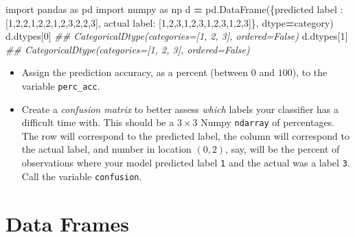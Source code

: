 \documentclass[
  12pt,
  krantz2]{krantz}
\makeatletter
\newenvironment{Shaded}{\begin{snugshade}}{\end{snugshade}}
\newcommand{\CommentTok}[1]{\textcolor[rgb]{0.37,0.37,0.37}{\textit{#1}}}
\newcommand{\DecValTok}[1]{\textcolor[rgb]{0.06,0.06,0.06}{#1}}
\newcommand{\ImportTok}[1]{#1}
\newcommand{\NormalTok}[1]{#1}
\newcommand{\OperatorTok}[1]{\textcolor[rgb]{0.43,0.43,0.43}{\textbf{#1}}}
\newcommand{\StringTok}[1]{\textcolor[rgb]{0.5,0.5,0.5}{#1}}
\providecommand{\tightlist}{%
  \setlength{\itemsep}{0pt}\setlength{\parskip}{0pt}}
\newenvironment{kframe}{%
\medskip{}
\setlength{\fboxsep}{.8em}
 \def\at@end@of@kframe{}%
 \ifinner\ifhmode%
  \def\at@end@of@kframe{\end{minipage}}%
  \begin{minipage}{\columnwidth}%
 \fi\fi%
 \def\FrameCommand##1{\hskip\@totalleftmargin \hskip-\fboxsep
 \colorbox{shadecolor}{##1}\hskip-\fboxsep
     \hskip-\linewidth \hskip-\@totalleftmargin \hskip\columnwidth}%
 \MakeFramed {\advance\hsize-\width
   \@totalleftmargin\z@ \linewidth\hsize
   \@setminipage}}%
 {\par\unskip\endMakeFramed%
 \at@end@of@kframe}
\renewenvironment{Shaded}{\begin{kframe}}{\end{kframe}}
\makeatother
\begin{document}
\begin{Shaded}
\begin{Highlighting}[]
\ImportTok{import}\NormalTok{ pandas }\ImportTok{as}\NormalTok{ pd}
\ImportTok{import}\NormalTok{ numpy }\ImportTok{as}\NormalTok{ np}
\NormalTok{d }\OperatorTok{=}\NormalTok{ pd.DataFrame(\{}\StringTok{\textquotesingle{}predicted label\textquotesingle{}}\NormalTok{ : [}\DecValTok{1}\NormalTok{,}\DecValTok{2}\NormalTok{,}\DecValTok{2}\NormalTok{,}\DecValTok{1}\NormalTok{,}\DecValTok{2}\NormalTok{,}\DecValTok{2}\NormalTok{,}\DecValTok{1}\NormalTok{,}\DecValTok{2}\NormalTok{,}\DecValTok{3}\NormalTok{,}\DecValTok{2}\NormalTok{,}\DecValTok{2}\NormalTok{,}\DecValTok{3}\NormalTok{], }
                  \StringTok{\textquotesingle{}actual label\textquotesingle{}}\NormalTok{: [}\DecValTok{1}\NormalTok{,}\DecValTok{2}\NormalTok{,}\DecValTok{3}\NormalTok{,}\DecValTok{1}\NormalTok{,}\DecValTok{2}\NormalTok{,}\DecValTok{3}\NormalTok{,}\DecValTok{1}\NormalTok{,}\DecValTok{2}\NormalTok{,}\DecValTok{3}\NormalTok{,}\DecValTok{1}\NormalTok{,}\DecValTok{2}\NormalTok{,}\DecValTok{3}\NormalTok{]\}, }
\NormalTok{                 dtype}\OperatorTok{=}\StringTok{\textquotesingle{}category\textquotesingle{}}\NormalTok{)}
\NormalTok{d.dtypes[}\DecValTok{0}\NormalTok{]}
\CommentTok{\#\# CategoricalDtype(categories=[1, 2, 3], ordered=False)}
\NormalTok{d.dtypes[}\DecValTok{1}\NormalTok{]}
\CommentTok{\#\# CategoricalDtype(categories=[1, 2, 3], ordered=False)}
\end{Highlighting}
\end{Shaded}

\begin{itemize}
\tightlist
\item
  Assign the prediction accuracy, as a percent (between \(0\) and \(100\)), to the variable \texttt{perc\_acc}.
\item
  Create a \emph{confusion matrix} to better assess \emph{which} labels your classifier has a difficult time with. This should be a \(3 \times 3\) Numpy \texttt{ndarray} of percentages. The row will correspond to the predicted label, the column will correspond to the actual label, and number in location \((0,2)\), say, will be the percent of observations where your model predicted label \texttt{1} and the actual was a label \texttt{3}. Call the variable \texttt{confusion}.
\end{itemize}

\hypertarget{data-frames}{%
\chapter{Data Frames}\label{data-frames}}
\end{document}
